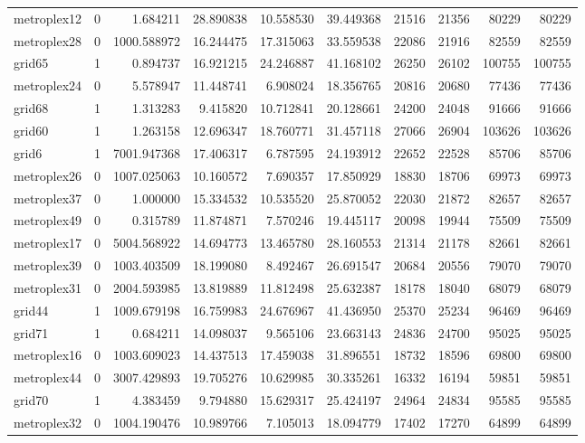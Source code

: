 \begin{longtable}{|l|r|r|r|r|r|r|r|r|r|}
metroplex12 & 0 & 1.684211 & 28.890838 & 10.558530 & 39.449368 & 21516 & 21356 & 80229 & 80229 \\
metroplex28 & 0 & 1000.588972 & 16.244475 & 17.315063 & 33.559538 & 22086 & 21916 & 82559 & 82559 \\
grid65 & 1 & 0.894737 & 16.921215 & 24.246887 & 41.168102 & 26250 & 26102 & 100755 & 100755 \\
metroplex24 & 0 & 5.578947 & 11.448741 & 6.908024 & 18.356765 & 20816 & 20680 & 77436 & 77436 \\
grid68 & 1 & 1.313283 & 9.415820 & 10.712841 & 20.128661 & 24200 & 24048 & 91666 & 91666 \\
grid60 & 1 & 1.263158 & 12.696347 & 18.760771 & 31.457118 & 27066 & 26904 & 103626 & 103626 \\
grid6 & 1 & 7001.947368 & 17.406317 & 6.787595 & 24.193912 & 22652 & 22528 & 85706 & 85706 \\
metroplex26 & 0 & 1007.025063 & 10.160572 & 7.690357 & 17.850929 & 18830 & 18706 & 69973 & 69973 \\
metroplex37 & 0 & 1.000000 & 15.334532 & 10.535520 & 25.870052 & 22030 & 21872 & 82657 & 82657 \\
metroplex49 & 0 & 0.315789 & 11.874871 & 7.570246 & 19.445117 & 20098 & 19944 & 75509 & 75509 \\
metroplex17 & 0 & 5004.568922 & 14.694773 & 13.465780 & 28.160553 & 21314 & 21178 & 82661 & 82661 \\
metroplex39 & 0 & 1003.403509 & 18.199080 & 8.492467 & 26.691547 & 20684 & 20556 & 79070 & 79070 \\
metroplex31 & 0 & 2004.593985 & 13.819889 & 11.812498 & 25.632387 & 18178 & 18040 & 68079 & 68079 \\
grid44 & 1 & 1009.679198 & 16.759983 & 24.676967 & 41.436950 & 25370 & 25234 & 96469 & 96469 \\
grid71 & 1 & 0.684211 & 14.098037 & 9.565106 & 23.663143 & 24836 & 24700 & 95025 & 95025 \\
metroplex16 & 0 & 1003.609023 & 14.437513 & 17.459038 & 31.896551 & 18732 & 18596 & 69800 & 69800 \\
metroplex44 & 0 & 3007.429893 & 19.705276 & 10.629985 & 30.335261 & 16332 & 16194 & 59851 & 59851 \\
grid70 & 1 & 4.383459 & 9.794880 & 15.629317 & 25.424197 & 24964 & 24834 & 95585 & 95585 \\
metroplex32 & 0 & 1004.190476 & 10.989766 & 7.105013 & 18.094779 & 17402 & 17270 & 64899 & 64899 \\

\end{longtable}

